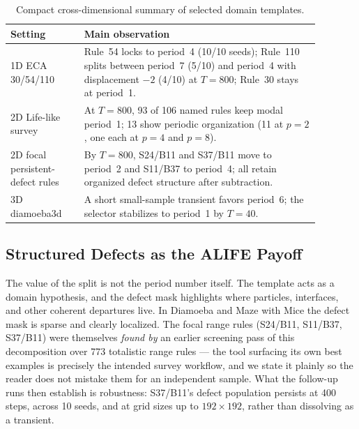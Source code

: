 \documentclass[letterpaper]{article}
\begin{document}
\begin{table}[t]
\centering
\caption{Compact cross-dimensional summary of selected domain templates.}
\label{tab:summary}
\small
\begin{tabular}{p{0.21\linewidth}p{0.67\linewidth}}
\toprule
Setting & Main observation \\
\midrule
1D ECA 30/54/110 & Rule~54 locks to period~4 (10/10 seeds); Rule~110
splits between period~7 (5/10) and period~4 with displacement $-2$ (4/10) at
$T=800$; Rule~30 stays at period~1. \\
2D Life-like survey & At $T=800$, 93 of 106 named rules keep modal
period~1; 13 show periodic organization (11 at $p{=}2$, one each at
$p{=}4$ and $p{=}8$). \\
2D focal persistent-defect rules & By $T{=}800$, S24/B11 and S37/B11
move to period~2 and S11/B37 to period~4; all retain organized defect
structure after subtraction. \\
3D diamoeba3d & A short small-sample transient favors period~6; the
selector stabilizes to period~1 by $T=40$. \\
\bottomrule
\end{tabular}
\end{table}

\subsection{Structured Defects as the ALIFE Payoff}

The value of the split is not the period number itself. The template
acts as a domain hypothesis, and the defect mask highlights where
particles, interfaces, and other coherent departures live. In Diamoeba
and Maze with Mice the defect mask is sparse and clearly localized. The
focal range rules (S24/B11, S11/B37, S37/B11) were themselves
\emph{found by} an earlier screening pass of this decomposition over
773 totalistic range rules --- the tool surfacing its own best examples
is precisely the intended survey workflow, and we state it plainly so
the reader does not mistake them for an independent sample. What the
follow-up runs then establish is robustness: S37/B11's defect
population persists at 400 steps, across 10 seeds, and at grid sizes up
to $192 \times 192$, rather than dissolving as a transient.
\end{document}
